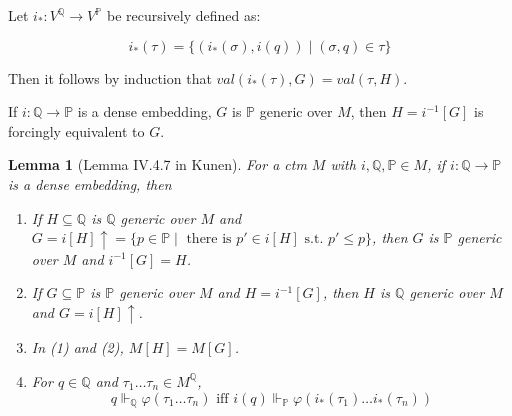 \documentclass{article}
\newtheorem{lemma}{Lemma}
\newcommand{\bbP}{\mathbb{P}}
\newcommand{\bbQ}{\mathbb{Q}}
\begin{document}
Let $i_*: V^\bbQ\to V^\bbP$ be recursively defined as:

$$i_*(\tau) = \{(i_*(\sigma),i(q))\mid (\sigma,q)\in \tau\}$$

Then it follows by induction that $val(i_*(\tau),G) = val(\tau,H)$.

If $i:\bbQ\to \bbP$ is a dense embedding, $G$ is $ \bbP$ generic over $M$, then $H = i^{-1}[G]$ is forcingly equivalent to $G$.

\begin{lemma}[Lemma IV.4.7 in Kunen]
    For a ctm $M$ with $i,\bbQ,\bbP\in M$, if $i:\bbQ\to \bbP$ is a dense embedding, then 

    \begin{enumerate}
        \item If $H\subseteq \bbQ$ is $\bbQ$ generic over $M$ and $G = i[H]\uparrow = \{p\in \bbP\mid \text{ there is } p'\in i[H] \text{ s.t. }p'\leq p\}$, then $G$ is $\bbP$ generic over $M$ and $i^{-1}[G] = H$.
        \item If $G\subseteq \bbP$ is $\bbP$ generic over $M$ and $H = i^{-1}[G]$, then $H$ is $\bbQ$ generic over $M$ and $G = i[H]\uparrow $.
        \item In (1) and (2), $M[H] = M[G]$.
        \item For $q\in \bbQ$ and $\tau_1\dots \tau_n\in M^\bbQ$, $$q\Vdash_\bbQ \varphi(\tau_1\dots \tau_n) \text{ iff } i(q)\Vdash_\bbP\varphi(i_*(\tau_1) \dots i_*(\tau_n))$$
    \end{enumerate}
\end{lemma}
\end{document}
